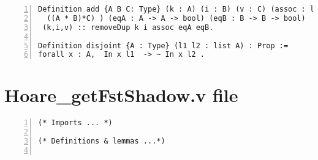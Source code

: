 \begin{appendices}
\begin{lstlisting}[xleftmargin=-.1\textwidth,
xrightmargin=-.1\textwidth,
mathescape=true,numbers=left]
Definition add {A B C: Type} (k : A) (i : B) (v : C) (assoc : list 
  ((A * B)*C) ) (eqA : A -> A -> bool) (eqB : B -> B -> bool)  :=
 (k,i,v) :: removeDup k i assoc eqA eqB.

Definition disjoint {A : Type} (l1 l2 : list A) : Prop := 
forall x : A,  In x l1  -> ~ In x l2 . 
\end{lstlisting}
\pagebreak
\section{Hoare\_getFstShadow.v file} \label{getFstFile}
\begin{lstlisting}[xleftmargin=-.1\textwidth,
xrightmargin=-.1\textwidth,
mathescape=true,numbers=left]
(* Imports ... *)

(* Definitions & lemmas ...*)


\end{lstlisting}
\end{appendices}
